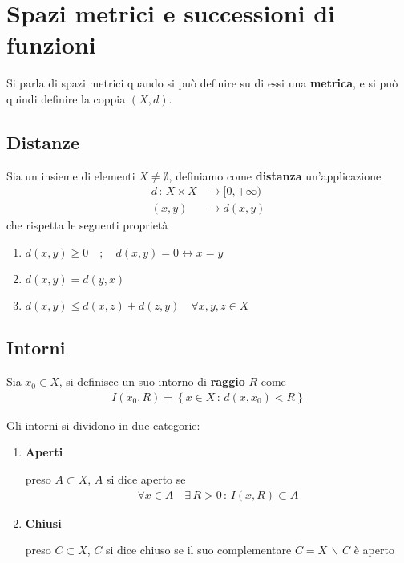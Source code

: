 \chapter{Spazi metrici e successioni di funzioni}

Si parla di spazi metrici quando si può definire su di essi una \textbf{metrica}, e si può quindi definire la coppia $(X,d)$.

\section{Distanze}

Sia un insieme di elementi $X \neq \emptyset$, definiamo come  \textbf{distanza} un'applicazione 
\begin{align}
d \, : \, X \times X {}&\rightarrow [0, + \infty) \\
(x,y) &\rightarrow d(x,y)
\end{align}
che rispetta le seguenti proprietà
\begin{enumerate}
	\item $d(x,y) \geq 0 \quad ; \quad d(x,y) = 0 \leftrightarrow x=y$
	\item $d(x,y)=d(y,x)$
	\item $d(x,y) \leq d(x,z) + d(z,y) \quad \forall x,y,z \in X$ \quad {}
\end{enumerate}

\section{Intorni}

Sia $x_0 \in X$, si definisce un suo intorno di \textbf{raggio} $R$ come
\begin{align}
I(x_0,R) = \left\{x\in X \, : \, d(x,x_0)<R
\right\}
\end{align}

Gli intorni si dividono in due categorie:
\begin{enumerate}
	\item \textbf{Aperti}
	
	preso $A \subset X$, $A$ si dice aperto se 
	\begin{align}
	\forall x \in A \quad \exists \, R>0 \, : \, I(x,R)\subset A
	\end{align}
	
	\item \textbf{Chiusi}
	
	preso $C \subset X$, $C$ si dice chiuso se il suo complementare $\overline{C}= X \, \backslash \, C$ è aperto
\end{enumerate}
\newpage

